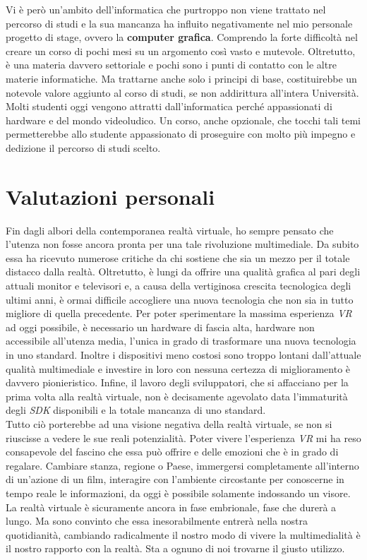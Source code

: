 Vi è però un'ambito dell'informatica che purtroppo non viene trattato nel percorso di studi e la sua mancanza ha influito negativamente nel mio personale progetto di stage, ovvero la \textbf{computer grafica}. Comprendo la forte difficoltà nel creare un corso di pochi mesi su un argomento così vasto e mutevole. Oltretutto, è una materia davvero settoriale e pochi sono i punti di contatto con le altre materie informatiche. Ma trattarne anche solo i principi di base, costituirebbe un notevole valore aggiunto al corso di studi, se non addirittura all'intera Università. Molti studenti oggi vengono attratti dall'informatica perché appassionati di hardware e del mondo videoludico. Un corso, anche opzionale, che tocchi tali temi permetterebbe allo studente appassionato di proseguire con molto più impegno e dedizione il percorso di studi scelto.  

\section{Valutazioni personali}

Fin dagli albori della contemporanea realtà virtuale, ho sempre pensato che l'utenza non fosse ancora pronta per una tale rivoluzione multimediale. Da subito essa ha ricevuto numerose critiche da chi sostiene che sia un mezzo per il totale distacco dalla realtà. Oltretutto, è lungi da offrire una qualità grafica al pari degli attuali monitor e televisori e, a causa della vertiginosa crescita tecnologica degli ultimi anni, è ormai difficile accogliere una nuova tecnologia che non sia in tutto migliore di quella precedente. Per poter sperimentare la massima esperienza \textit{VR} ad oggi possibile, è necessario un hardware di fascia alta, hardware non accessibile all'utenza media, l'unica in grado di trasformare una nuova tecnologia in uno standard. Inoltre i dispositivi meno costosi sono troppo lontani dall'attuale qualità multimediale e investire in loro con nessuna certezza di miglioramento è davvero pionieristico. Infine, il lavoro degli sviluppatori, che si affacciano per la prima volta alla realtà virtuale, non è decisamente agevolato data l'immaturità degli \textit{SDK} disponibili e la totale mancanza di uno standard. \\ 
Tutto ciò porterebbe ad una visione negativa della realtà virtuale, se non si riuscisse a vedere le sue reali potenzialità. Poter vivere l'esperienza \textit{VR} mi ha reso consapevole del fascino che essa può offrire e delle emozioni che è in grado di regalare. Cambiare stanza, regione o Paese, immergersi completamente all'interno di un'azione di un film, interagire con l'ambiente circostante per conoscerne in tempo reale le informazioni, da oggi è possibile solamente indossando un visore. \\
La realtà virtuale è sicuramente ancora in fase embrionale, fase che durerà a lungo. Ma sono convinto che essa inesorabilmente entrerà nella nostra quotidianità, cambiando radicalmente il nostro modo di vivere la multimedialità è il nostro rapporto con la realtà. Sta a ognuno di noi trovarne il giusto utilizzo.  